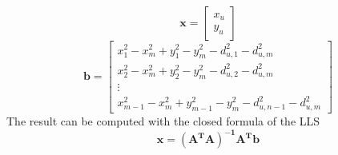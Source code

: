 \documentclass[12pt]{report}
\begin{document}
\begin{equation}
    \mathbf{x}=\begin{bmatrix}
    x_u\\
    y_u
    \end{bmatrix}
\end{equation}
\begin{equation}
    \mathbf{b}=\begin{bmatrix}
        x_{1}^2-x_m^2+y_{1}^2-y_m^2-d_{u,1}^2-d^2_{u,m}\\
        x_{2}^2-x_m^2+y_{2}^2-y_m^2-d_{u,2}^2-d^2_{u,m}\\
        \vdots\\
        x_{m-1}^2-x_m^2+y_{m-1}^2-y_m^2-d_{u,n-1}^2-d^2_{u,m}
    \end{bmatrix}
\end{equation}
The result can be computed with the closed formula of the LLS
\begin{equation}
    \mathbf{x}=\mathbf{(A^TA)^{-1}A^Tb}
\end{equation}
\clearpage
\end{document}
